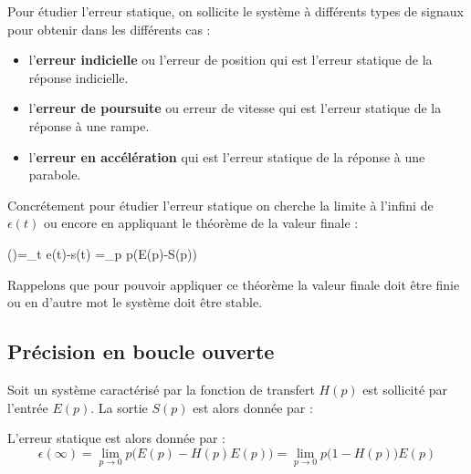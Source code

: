 Pour étudier l'erreur statique, on sollicite le système à différents 
types de signaux pour obtenir dans les différents cas :
\begin{itemize}
	\item l'\textbf{erreur indicielle} ou l'erreur de position qui est 
		  l'erreur statique de la réponse indicielle.
	\item l'\textbf{erreur de poursuite} ou erreur de vitesse qui est 
		  l'erreur statique de la réponse à une rampe.
	\item l'\textbf{erreur en accélération} qui est l'erreur statique 
		  de la réponse à une parabole.
\end{itemize}
Concrétement pour étudier l'erreur statique on cherche la limite à l'infini 
de $\epsilon(t)$ ou encore en appliquant le théorème de la valeur finale :
\begin{bequation}
\epsilon(\infty)=\lim\limits_{t\to\infty} e(t)-s(t)
	            =\lim\limits_{p} p\big(E(p)-S(p)\big)
\end{bequation}
Rappelons que pour pouvoir appliquer ce théorème la valeur finale doit 
être finie ou en d'autre mot le système doit être stable.
\subsection{Précision en boucle ouverte}
Soit un système caractérisé par la fonction de transfert $H(p)$ 
est sollicité par l'entrée $E(p)$. La sortie $S(p)$ est alors donnée par :
\begin{center}
    
\end{center}
L'erreur statique est alors donnée par :
\[
\epsilon(\infty)=\lim\limits_{p\to 0} p\big(E(p)-H(p)E(p)\big)
                =\lim\limits_{p\to 0} p\big(1-H(p)\big)E(p)
\]
